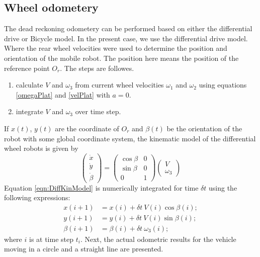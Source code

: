\subsection{Wheel odometery }
The dead reckoning odometery can be performed based on either the differential drive or Bicycle model. In the present case, we use the differential drive model. Where the rear wheel velocities were used to determine the position and orientation of the mobile robot. The position here means the position of the reference point $O_r$. The steps are followes.
\begin{enumerate}
	\item calculate $V$ and $\omega_3$ from current wheel velocities $\omega_1$  and  $\omega_2$  using equations \ref{omegaPlat} and \ref{velPlat} with $a=0$.
	\item integrate $V$ and $\omega_3$ over time step.
\end{enumerate}
If $x(t)$, $y(t)$ are the coordinate of $O_r$  and  $\beta(t)$ be the orientation of the robot with some global coordinate system, the kinematic model of the differential wheel robots is given by \cite{campion1996structural}  
\begin{equation}
\label{eqn:DiffKinModel}
\begin{pmatrix}
\dot{x}\\\dot{y}\\\dot{\beta}
\end{pmatrix}=
\begin{pmatrix}
\cos\beta & 0\\
\sin\beta & 0\\
0&1
\end{pmatrix}
\begin{pmatrix}
V\\\omega_3
\end{pmatrix}
\end{equation}
Equation \ref{eqn:DiffKinModel} is numerically integrated for time $\delta t$ using the following expressions:
\begin{align}
\label{eqn:odo1}
 x(i+1)&=x(i)+\delta t~ V(i)\cos\beta(i);\\
 \label{eqn:odo2}
y(i+1)&=y(i)+\delta t~V(i)\sin\beta(i);\\
\label{eqn:odo3}
\beta(i+1)&=\beta(i)+\delta t~\omega_3(i);
\end{align}
where $i$ is at time step $t_i$. Next,  the actual odometric results for the vehicle moving in a circle and a straight line are presented.
